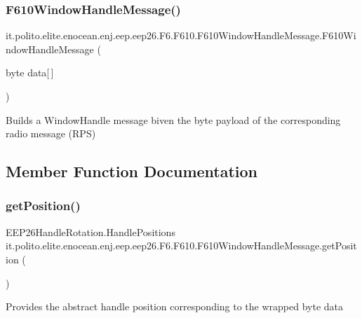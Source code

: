\subsubsection{\texorpdfstring{F610\+Window\+Handle\+Message()}{F610WindowHandleMessage()}}
{\footnotesize\ttfamily it.\+polito.\+elite.\+enocean.\+enj.\+eep.\+eep26.\+F6.\+F610.\+F610\+Window\+Handle\+Message.\+F610\+Window\+Handle\+Message (\begin{DoxyParamCaption}\item[{byte}]{data\mbox{[}$\,$\mbox{]} }\end{DoxyParamCaption})}

Builds a Window\+Handle message biven the byte payload of the corresponding radio message (R\+PS) 

\subsection{Member Function Documentation}
\hypertarget{classit_1_1polito_1_1elite_1_1enocean_1_1enj_1_1eep_1_1eep26_1_1_f6_1_1_f610_1_1_f610_window_handle_message_abc27e79ba739e02b71fe49f1edaba01b}{}\label{classit_1_1polito_1_1elite_1_1enocean_1_1enj_1_1eep_1_1eep26_1_1_f6_1_1_f610_1_1_f610_window_handle_message_abc27e79ba739e02b71fe49f1edaba01b} 
\subsubsection{\texorpdfstring{get\+Position()}{getPosition()}}
{\footnotesize\ttfamily E\+E\+P26\+Handle\+Rotation.\+Handle\+Positions it.\+polito.\+elite.\+enocean.\+enj.\+eep.\+eep26.\+F6.\+F610.\+F610\+Window\+Handle\+Message.\+get\+Position (\begin{DoxyParamCaption}{ }\end{DoxyParamCaption})}

Provides the abstract handle position corresponding to the wrapped byte data

